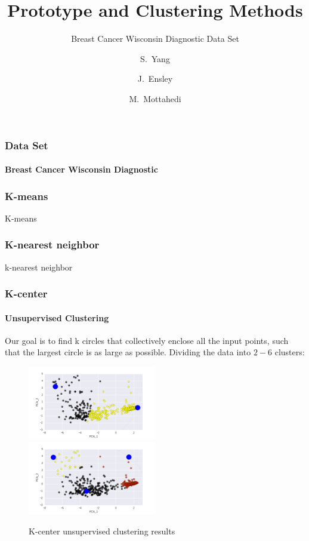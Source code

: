 \documentclass[pdf]{beamer}
\title{Prototype and Clustering Methods}
\subtitle{Breast Cancer Wisconsin Diagnostic Data Set}
\author{S.~Yang \and J.~Ensley \and M.~Mottahedi}
\begin{document}
  \frame{\titlepage}

  \begin{frame}
    \frametitle{Data Set}
    \framesubtitle{Breast Cancer Wisconsin Diagnostic}
  \end{frame}

  \begin{frame}
    \frametitle{K-means}
    K-means
  \end{frame}

  \begin{frame}
    \frametitle{K-nearest neighbor}
    k-nearest neighbor
  \end{frame}


  \begin{frame}
    \frametitle{K-center}
    \framesubtitle{Unsupervised Clustering}
    Our goal is to find k circles that collectively enclose all the input points, such that the largest circle is as large as possible.
    Dividing the data into $2-6$ clusters:
    \begin{figure}
    \centering
    \includegraphics[width=0.5\textwidth]{m1.png}
    \includegraphics[width=0.5\textwidth]{m2.png}
    \caption{K-center unsupervised clustering results}
    \end{figure}


    \end{frame}
\end{document}
